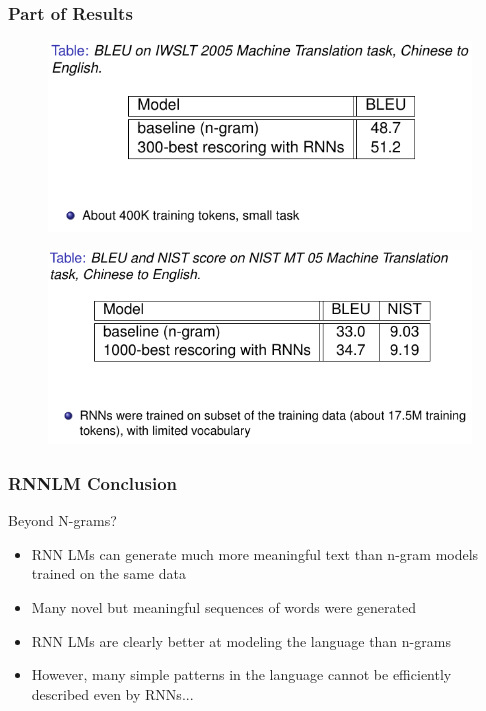 \documentclass{beamer}
\begin{document}
\begin{frame}\frametitle{Part of Results}
\begin{figure}
\includegraphics[width=0.65\linewidth]{figure/nnlm_rst1.pdf}
\end{figure}
\vspace{-8pt}
\begin{figure}
\includegraphics[width=0.7\linewidth]{figure/nnlm_rst2.pdf}
\end{figure}
\end{frame}
\begin{frame}\frametitle{RNNLM Conclusion}
\begin{block}{Beyond N-grams?}
\begin{itemize}
\item RNN LMs can generate much more meaningful text than
n-gram models trained on the same data
\item Many novel but meaningful sequences of words were
generated
\item RNN LMs are clearly better at modeling the language than
n-grams
\item However, many simple patterns in the language cannot be
efficiently described even by RNNs...
\end{itemize}
\end{block}
\end{frame}
\end{document}
